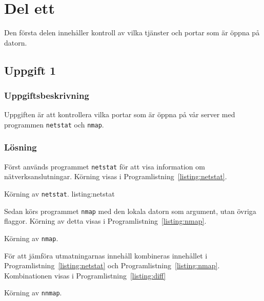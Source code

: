 %
%
%


\section{Del ett}
Den första delen innehåller kontroll av vilka tjänster och portar som är öppna
på datorn.


\subsection{Uppgift 1}
\subsubsection{Uppgiftsbeskrivning}
Uppgiften är att kontrollera vilka portar som är öppna på vår server med
programmen \texttt{netstat} och \texttt{nmap}.  


\subsubsection{Lösning}
Först används programmet \texttt{netstat} för att visa information om
nätverksanslutningar. Körning visas i Programlistning~\ref{listing:netstat}.


					  {Körning av \texttt{netstat}.}
			 	    {listing:netstat}

Sedan körs programmet \texttt{nmap} med den lokala datorn som argument, utan
övriga flaggor. Körning av detta visas i Programlistning~\ref{listing:nmap}.

\begin{listing}[H]
  \caption{Körning av \texttt{nmap}.}
  \label{listing:nmap}
\end{listing}

För att jämföra utmatningarnas innehåll kombineras innehållet i
Programlistning~\ref{listing:netstat} och Programlistning~\ref{listing:nmap}.
Kombinationen visas i Programlistning~\ref{listing:diff}

\begin{listing}[H]
  \caption{Körning av \texttt{nnmap}.}
  \label{listing:nmap}
\end{listing}
